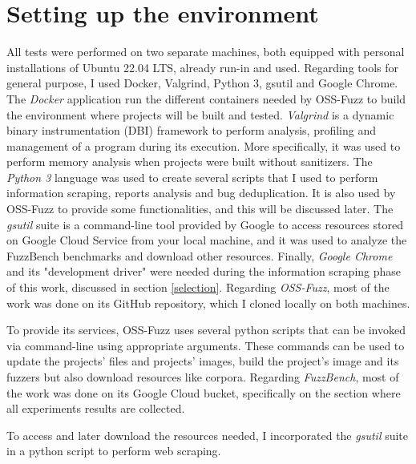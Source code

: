 \section{Setting up the environment}

 

All tests were performed on two separate machines, both equipped with personal installations of Ubuntu 22.04 LTS, already run-in and used.
Regarding tools for general purpose, I used Docker, Valgrind, Python 3, gsutil and Google Chrome.
The \textit{Docker} \cite{Docker} application run the different containers needed by OSS-Fuzz to build the environment where projects will be built and tested.
\textit{Valgrind} \cite{Valgrind_1}\cite{Valgrind_2} is a dynamic binary instrumentation (DBI) framework to perform analysis, profiling and management of a program during its execution.
More specifically, it was used to perform memory analysis when projects were built without sanitizers.
The \textit{Python 3} language was used to create several scripts that I used to perform information scraping, reports analysis and bug deduplication.
It is also used by OSS-Fuzz to provide some functionalities, and this will be discussed later. 
The \textit{gsutil} suite is a command-line tool provided by Google to access resources stored on Google Cloud Service from your local machine, and it was used to analyze the FuzzBench benchmarks and download other resources.
Finally, \textit{Google Chrome} and its "development driver" were needed during the information scraping phase of this work, discussed in section \ref{selection}.
Regarding \textit{OSS-Fuzz}, most of the work was done on its GitHub repository, which I cloned locally on both machines.

To provide its services, OSS-Fuzz uses several python scripts that can be invoked via command-line using appropriate arguments. These commands can be used to update the projects' files and projects' images, build the project's image and its fuzzers but also download resources like corpora. 
Regarding \textit{FuzzBench}, most of the work was done on its Google Cloud bucket, specifically on the section where all experiments results are collected.

To access and later download the resources needed, I incorporated the \textit{gsutil} suite in a python script to perform web scraping.


